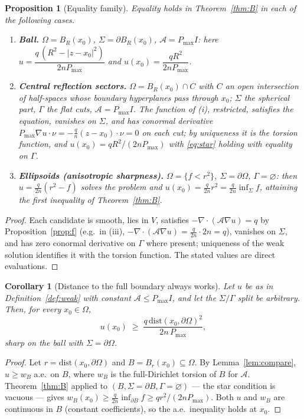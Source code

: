 \documentclass[10pt]{article}
\newtheorem{proposition}[theorem]{Proposition}
\newtheorem{corollary}[theorem]{Corollary}
\theoremstyle{remark}
\newcommand{\A}{\mathcal{A}}
\newcommand{\Om}{\Omega}
\newcommand{\Sig}{\Sigma}
\newcommand{\Gam}{\Gamma}
\newcommand{\Pmax}{P_{\max}}
\begin{document}
\begin{proposition}[Equality family]\label{prop:equality}
Equality holds in Theorem~\ref{thm:B} in each of the following cases.
\begin{enumerate}
\item[\emph{(i)}] \textbf{Ball.} $\Om=B_R(x_0)$, $\Sig=\partial B_R(x_0)$,
$\A=\Pmax I$: here $u=\dfrac{q\,(R^2-|z-x_0|^2)}{2n\Pmax}$ and
$u(x_0)=\dfrac{qR^2}{2n\Pmax}$.
\item[\emph{(ii)}] \textbf{Central reflection sectors.}
$\Om=B_R(x_0)\cap C$ with $C$ an open intersection of half-spaces whose
boundary hyperplanes pass through $x_0$; $\Sig$ the spherical part, $\Gam$ the
flat cuts, $\A=\Pmax I$. The function of \emph{(i)}, restricted, satisfies the
equation, vanishes on $\Sig$, and has conormal derivative
$\Pmax\nabla u\cdot\nu=-\tfrac qn(z-x_0)\cdot\nu=0$ on each cut; by uniqueness
it \emph{is} the torsion function, and $u(x_0)=qR^2/(2n\Pmax)$ with
\eqref{eq:star} holding with equality on $\Gam$.
\item[\emph{(iii)}] \textbf{Ellipsoids (anisotropic sharpness).}
$\Om=\{f<r^2\}$, $\Sig=\partial\Om$, $\Gam=\varnothing$: then
$u=\tfrac{q}{2n}(r^2-f)$ solves the problem and
$u(x_0)=\tfrac{q}{2n}r^2=\tfrac{q}{2n}\inf_{\Sig}f$, attaining the first
inequality of Theorem~\ref{thm:B}.
\end{enumerate}
\end{proposition}

\begin{proof}
Each candidate is smooth, lies in $V$, satisfies
$-\nabla\!\cdot\!(\A\nabla u)=q$ by Proposition~\ref{prop:f}
(e.g.\ in (iii), $-\nabla\!\cdot\!(\A\nabla u)=\tfrac{q}{2n}\cdot 2n=q$),
vanishes on $\Sig$, and has zero conormal derivative on $\Gam$ where present;
uniqueness of the weak solution identifies it with the torsion function. The
stated values are direct evaluations.
\end{proof}

\begin{corollary}[Distance to the full boundary always works]\label{cor:fullbdry}
Let $u$ be as in Definition~\ref{def:weak} with \emph{constant}
$\A\le\Pmax I$, and let the $\Sig/\Gam$ split be arbitrary. Then, for every
$x_0\in\Om$,
\[
u(x_0)\;\ge\;\frac{q\,\mathrm{dist}(x_0,\partial\Om)^2}{2n\,\Pmax},
\]
sharp on the ball with $\Sig=\partial\Om$.
\end{corollary}

\begin{proof}
Let $r=\mathrm{dist}(x_0,\partial\Om)$ and $B=B_r(x_0)\subseteq\Om$. By
Lemma~\ref{lem:compare}, $u\ge w_B$ a.e.\ on $B$, where $w_B$ is the
full-Dirichlet torsion of $B$ for $\A$. Theorem~\ref{thm:B} applied to
$(B,\Sig=\partial B,\Gam=\varnothing)$ --- the star condition is vacuous ---
gives $w_B(x_0)\ge \tfrac{q}{2n}\inf_{\partial B}f\ge qr^2/(2n\Pmax)$. Both
$u$ and $w_B$ are continuous in $B$ (constant coefficients), so the a.e.\
inequality holds at $x_0$.
\end{proof}
\end{document}
